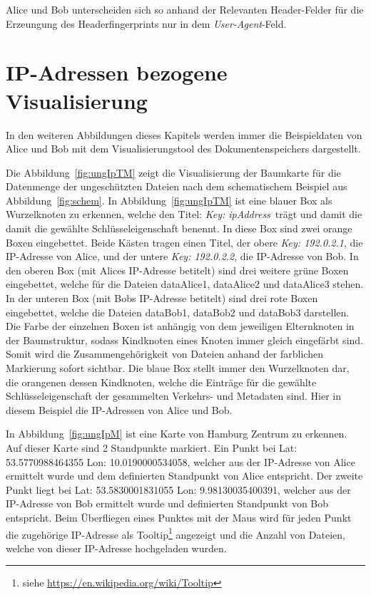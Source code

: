 \documentclass[
    fontsize=12pt,
    headings=small,
    parskip=half,           %
    bibliography=totoc,
    numbers=noenddot,       %
    open=any,               %
    ]{scrreprt}
\begin{document}
Alice und Bob unterscheiden sich so anhand der Relevanten Header-Felder für die Erzeungung des Headerfingerprints nur in dem \textit{User-Agent}-Feld.

\section{IP-Adressen bezogene Visualisierung} \label{ipVis}

In den weiteren Abbildungen dieses Kapitels werden immer die Beispieldaten von Alice und Bob mit dem Visualisierungstool des Dokumentenspeichers dargestellt.

Die Abbildung~\ref{fig:ungIpTM} zeigt die Visualisierung der Baumkarte für die Datenmenge der ungeschützten Dateien nach dem schematischem Beispiel aus Abbildung~\ref{fig:schem}. 
In Abbildung~\ref{fig:ungIpTM} ist eine blauer Box als Wurzelknoten zu erkennen, welche den Titel: \glqq \textit{Key: ipAddress}\grqq ~trägt und damit die damit die gewählte Schlüsseleigenschaft benennt.
In diese Box sind zwei orange Boxen eingebettet.
Beide Kästen tragen einen Titel, der obere \glqq \textit{Key: 192.0.2.1}\grqq, die IP-Adresse von Alice, und der untere \glqq \textit{Key: 192.0.2.2}\grqq, die IP-Adresse von Bob.
In den oberen Box (mit Alices IP-Adresse betitelt) sind drei weitere grüne Boxen eingebettet, welche für die Dateien dataAlice1, dataAlice2 und dataAlice3 stehen.
In der unteren Box (mit Bobs IP-Adresse betitelt) sind drei rote Boxen eingebettet, welche die Dateien dataBob1, dataBob2 und dataBob3 darstellen.
Die Farbe der einzelnen Boxen ist anhängig von dem jeweiligen Elternknoten in der Baumstruktur, sodass Kindknoten eines Knoten immer gleich eingefärbt sind.
Somit wird die Zusammengehörigkeit von Dateien anhand der farblichen Markierung sofort sichtbar.
Die blaue Box stellt immer den Wurzelknoten dar, die orangenen dessen Kindknoten, welche die Einträge für die gewählte Schlüsseleigenschaft der gesammelten Verkehrs- und Metadaten sind.
Hier in diesem Beispiel die IP-Adressen von Alice und Bob.

In Abbildung~\ref{fig:ungIpM} ist eine Karte von Hamburg Zentrum zu erkennen.
Auf dieser Karte sind 2 Standpunkte markiert.
Ein Punkt bei \ac{Lat}: 53.5770988464355 \ac{Lon}: 10.0190000534058, welcher aus der IP-Adresse von Alice ermittelt wurde und dem definierten Standpunkt von Alice entspricht.
Der zweite Punkt liegt bei \ac{Lat}: 53.5830001831055 \ac{Lon}: 9.98130035400391, welcher aus der IP-Adresse von Bob ermittelt wurde und definierten Standpunkt von Bob entspricht.
Beim Überfliegen eines Punktes mit der Maus wird für jeden Punkt die zugehörige IP-Adresse als Tooltip\footnote{siehe \url{https://en.wikipedia.org/wiki/Tooltip}} angezeigt und die Anzahl von Dateien, welche von dieser IP-Adresse hochgeladen wurden.
\end{document}

